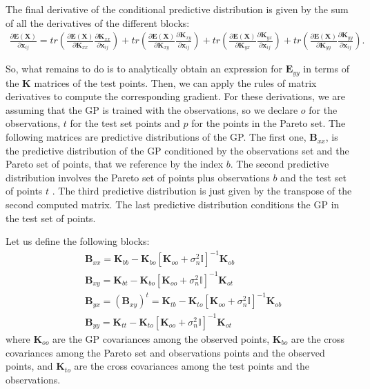 The final derivative of the conditional predictive distribution is given by the sum of all the derivatives of the different blocks:
\begin{align}
\frac{\partial \mathbf{E}(\mathbf{X})}{\partial \mathbf{x}_{ij}} = tr(\frac{\partial \mathbf{E}(\mathbf{X})}{\partial \mathbf{K}_{xx}} \frac{\partial \mathbf{K}_{xx}}{\partial \mathbf{x}_{ij}}) + tr(\frac{\partial \mathbf{E}(\mathbf{X})}{\partial \mathbf{K}_{xy}} \frac{\partial \mathbf{K}_{xy}}{\partial \mathbf{x}_{ij}}) + tr(\frac{\partial \mathbf{E}(\mathbf{X})}{\partial \mathbf{K}_{yx}} \frac{\partial \mathbf{K}_{yx}}{\partial \mathbf{x}_{ij}}) + tr(\frac{\partial \mathbf{E}(\mathbf{X})}{\partial \mathbf{K}_{yy}} \frac{\partial \mathbf{K}_{yy}}{\partial \mathbf{x}_{ij}}).
\end{align}

So, what remains to do is to analytically obtain an expression for $\mathbf{E}_{yy}$ in terms of the $\mathbf{K}$ matrices of the test points. Then, we can apply the rules of matrix derivatives to compute the corresponding gradient. For these derivations, we are assuming that the GP is trained with the observations, so we declare $o$ for the observations, $t$ for the test set points and $p$ for the points in the Pareto set. The following matrices are predictive distributions of the GP. The first one, $\mathbf{B}_{xx}$, is the predictive distribution of the GP conditioned by the observations set and the Pareto set of points, that we reference by the index $b$. The second predictive distribution involves the Pareto set of points plus observations $b$ and the test set of points $t$ . The third predictive distribution is just given by the transpose of the second computed matrix. The last predictive distribution conditions the GP in the test set of points.

Let us define the following blocks:
\begin{align}
& \mathbf{B}_{xx} = \mathbf{K}_{bb} - \mathbf{K}_{bo}[\mathbf{K}_{oo}+\sigma_n^2\mathbb{I}]^{-1}\mathbf{K}_{ob} \\
& \mathbf{B}_{xy} = \mathbf{K}_{bt} - \mathbf{K}_{bo}[\mathbf{K}_{oo}+\sigma_n^2\mathbb{I}]^{-1}\mathbf{K}_{ot} \\
& \mathbf{B}_{yx} = (\mathbf{B}_{xy})^t = \mathbf{K}_{tb} - \mathbf{K}_{to}[\mathbf{K}_{oo}+\sigma_n^2\mathbb{I}]^{-1}\mathbf{K}_{ob}\\
& \mathbf{B}_{yy} = \mathbf{K}_{tt} - \mathbf{K}_{to}[\mathbf{K}_{oo}+\sigma_n^2\mathbb{I}]^{-1}\mathbf{K}_{ot} 
\end{align}
where $\mathbf{K}_{oo}$ are the GP covariances among the observed points, $\mathbf{K}_{bo}$ are the cross covariances
among the Pareto set and observations points and the observed points, and $\mathbf{K}_{to}$ are the cross covariances
among the test points and the observations. 


